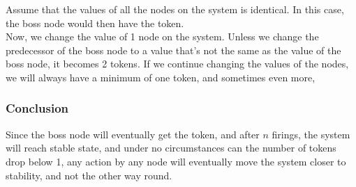 \documentclass[]{article}
\begin{document}
Assume that the values of all the nodes on the system is identical. In this case, the boss node would then have the token.\\

Now, we change the value of 1 node on the system. Unless we change the predecessor of the boss node to a value that's not the same as the value of the boss node, it becomes 2 tokens. If we continue changing the values of the nodes, we will always have a minimum of one token, and sometimes even more,\\

\subsubsection{Conclusion}
Since the boss node will eventually get the token, and after $n$ firings, the system will reach stable state, and under no circumstances can the number of tokens drop below 1, any action by any node will eventually move the system closer to stability, and not the other way round.\\
\end{document}
